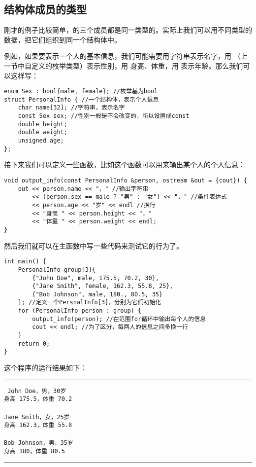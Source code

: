 \subsection*{结构体成员的类型}
刚才的例子比较简单，\lstinline@Cuboid@ 的三个成员都是同一类型的。实际上我们可以用不同类型的数据，把它们组织到同一个结构体中。\par
例如，如果要表示一个人的基本信息，我们可能需要用字符串表示名字，用 \lstinline@Sex@（上一节中自定义的枚举类型）表示性别，用 \lstinline@double@ 身高、体重，用 \lstinline@unsigned@ 表示年龄。那么我们可以这样写：
\begin{lstlisting}
enum Sex : bool{male, female}; //枚举基为bool
struct PersonalInfo { //一个结构体，表示个人信息
    char name[32]; //字符串，表示名字
    const Sex sex; //性别一般是不会改变的，所以设置成const
    double height;
    double weight;
    unsigned age;
};
\end{lstlisting}
接下来我们可以定义一些函数，比如这个函数可以用来输出某个人的个人信息：
\begin{lstlisting}
void output_info(const PersonalInfo &person, ostream &out = {cout}) {
    out << person.name << "，" //输出字符串
        << (person.sex == male ? "男" : "女") << "，" //条件表达式
        << person.age << "岁" << endl //换行
        << "身高 " << person.height << "，"
        << "体重 " << person.weight << endl;
}
\end{lstlisting}
然后我们就可以在主函数中写一些代码来测试它的行为了。
\begin{lstlisting}
int main() {
    PersonalInfo group[3]{
        {"John Doe", male, 175.5, 70.2, 30},
        {"Jane Smith", female, 162.3, 55.8, 25},
        {"Bob Johnson", male, 180., 80.5, 35}
    }; //定义一个PersnalInfo[3]，分别为它们初始化
    for (PersonalInfo person : group) {
        output_info(person); //在范围for循环中输出每个人的信息
        cout << endl; //为了区分，每两人的信息之间多换一行
    }
    return 0;
}
\end{lstlisting}
这个程序的运行结果如下：\\\noindent\rule{\linewidth}{.2pt}\texttt{
John Doe，男，30岁\\
身高 175.5，体重 70.2\\
\\
Jane Smith，女，25岁\\
身高 162.3，体重 55.8\\
\\
Bob Johnson，男，35岁\\
身高 180，体重 80.5
}\\\noindent\rule{\linewidth}{.2pt}\par
